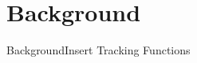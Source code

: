 \documentclass{beamer}
\begin{document}



\section{Background}

\begin{frame}{Background}{Insert Tracking Functions}

\end{frame}
\end{document}

